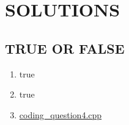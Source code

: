 \documentclass[a4paper]{article}
\begin{document}
\section{SOLUTIONS}
\subsection{TRUE OR FALSE}
\begin{enumerate}
    \item true
    \item true
    \item \href{run:./coding_question4.cpp}{coding\_question4.cpp}
\end{enumerate}
\end{document}
